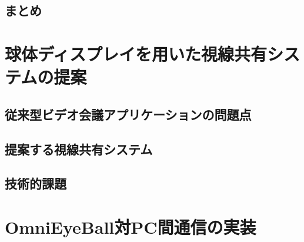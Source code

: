 \documentclass[a4j,11pt,oneside,openany,report]{jsbook}
\begin{document}
\section{まとめ}

\chapter{球体ディスプレイを用いた視線共有システムの提案}
\section{従来型ビデオ会議アプリケーションの問題点}
\section{提案する視線共有システム}
\section{技術的課題}

\chapter{OmniEyeBall対PC間通信の実装}
\end{document}

